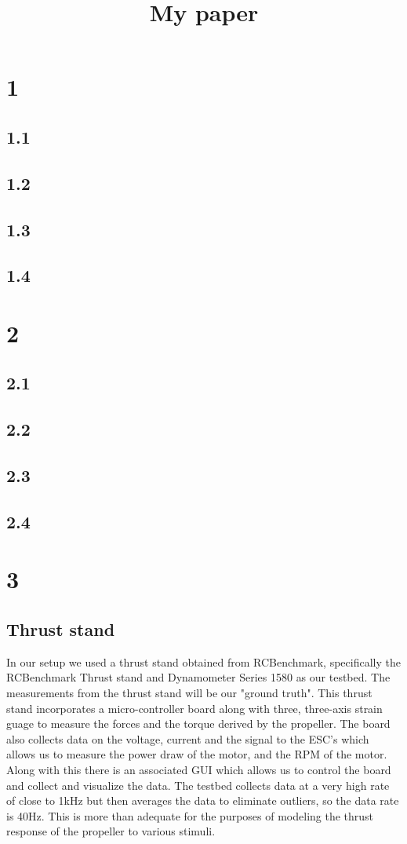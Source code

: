 \documentclass[twocolumn]{article}
\begin{document}
	\title{\begin{titlepage}
			My paper
	\end{titlepage}}
	\section{1}
	\subsection{1.1}
	\subsection{1.2}
	\subsection{1.3}
	\subsection{1.4}
	
	\section{2}
	\subsection{2.1}
	\subsection{2.2}
	\subsection{2.3}
	\subsection{2.4}
	
	\section{3}
	\subsection{Thrust stand}
	In our setup we used a thrust stand obtained from RCBenchmark, specifically the RCBenchmark Thrust stand and Dynamometer Series 1580 \cite{rcb} as our testbed. The measurements from the thrust stand will be our "ground truth". This thrust stand incorporates a micro-controller board along with three, three-axis strain guage to measure the forces and the torque derived by the propeller. The board also collects data on the voltage, current and the signal to the ESC's which allows us to measure the power draw of the motor, and the RPM of the motor. Along with this there is an associated GUI which allows us to control the board and collect and visualize the data. The testbed collects data at a very high rate of close to 1kHz but then averages the data to eliminate outliers, so the data rate is 40Hz. This is more than adequate for the purposes of modeling the thrust response of the propeller to various stimuli. 
\end{document}
